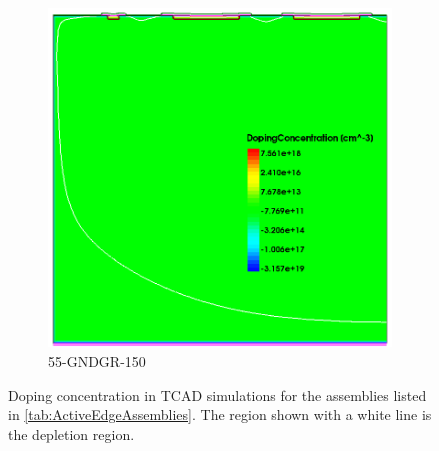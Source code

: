 \begin{figure}[htbp]
  \begin{subfigure}[b]{0.5\linewidth}
    \includegraphics[width=\textwidth]{figures/TCAD/dopingConcentration_55_GNDGR_150.png}
    \caption{55-GNDGR-150}
  \end{subfigure}
  \caption{Doping concentration in TCAD simulations for the assemblies
    listed in \cref{tab:ActiveEdgeAssemblies}. The region shown
    with a white line is the depletion region.}
  \label{fig:TCAD_dopingConcentration}
\end{figure}
